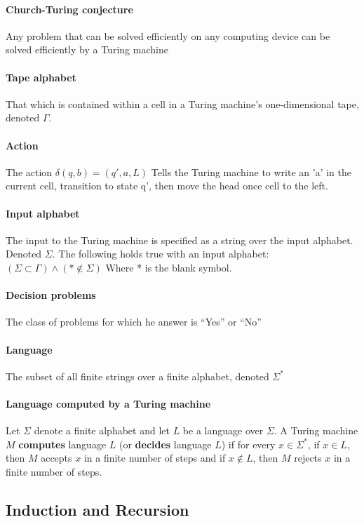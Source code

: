 \documentclass[a4paper]{article}
\begin{document}
\paragraph{Church-Turing conjecture} Any problem that can be solved efficiently on any computing device can be solved efficiently by a Turing machine
\paragraph{Tape alphabet} That which is contained within a cell in a Turing machine's one-dimensional tape, denoted $\Gamma$. 
\paragraph{Action} The action $\delta(q, b) = (q', a, L)$ Tells the Turing machine to write an 'a' in the current cell, transition to state q', then move the head once cell to the left.
\paragraph{Input alphabet}  The input to the Turing machine is specified as a string over the input alphabet. Denoted $\Sigma$. The following holds true with an input alphabet: $(\Sigma \subset \Gamma) \land (* \notin \Sigma)$ Where * is the blank symbol.
\paragraph{Decision problems} The class of problems for which he answer is ``Yes'' or ``No''
\paragraph{Language} The subset of all finite strings over a finite alphabet, denoted $\Sigma^*$
\paragraph{Language computed by a Turing machine} Let $\Sigma$ denote a finite alphabet and let $L$ be a language over $\Sigma$. A Turing machine $M$ \textbf{computes} language $L$ (or \textbf{decides} language $L$) if for every $x \in \Sigma^*$, if $x \in L$, then $M$ accepts $x$ in a finite number of steps and if $x \notin L$, then $M$ rejects $x$ in a finite number of steps.
\pagebreak

\subsection{Induction and Recursion}
\end{document}

